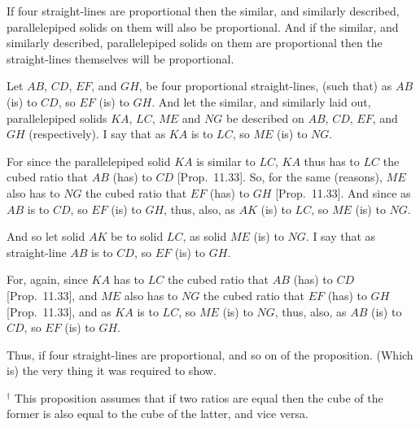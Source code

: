 \begin{Parallel}{}{}
{If four straight-lines are  proportional then the  similar, and similarly described, parallelepiped solids on them will
also be proportional. And if the similar, and similarly
described, parallelepiped solids on them are proportional
then the straight-lines themselves will be  proportional.\\

\epsfysize=1.9in
\centerline{}

Let $AB$, $CD$, $EF$, and $GH$, be four proportional
straight-lines, (such that) as $AB$ (is) to $CD$, so $EF$ (is) to $GH$. 
And let the similar, and similarly laid out, parallelepiped solids $KA$,
$LC$, $ME$ and $NG$ be described on $AB$, $CD$,
$EF$, and $GH$ (respectively). I say that as $KA$ is to $LC$, so
$ME$ (is) to $NG$.

For since the parallelepiped solid $KA$ is similar to $LC$, $KA$
thus has to $LC$ the cubed ratio that $AB$ (has) to $CD$ [Prop.~11.33]. So, for the same (reasons), $ME$ also has to
$NG$ the cubed ratio that $EF$ (has) to $GH$ [Prop.~11.33]. And since as $AB$
is to $CD$, so $EF$ (is) to $GH$, thus, also,  as $AK$ (is) to
$LC$, so $ME$ (is) to $NG$.

And so let solid $AK$ be to solid $LC$, as solid $ME$ (is) to $NG$.
I say that as straight-line $AB$ is to $CD$, so $EF$ (is) to $GH$.

For, again, since $KA$ has to $LC$ the cubed ratio that
$AB$ (has) to $CD$ [Prop.~11.33], and $ME$ also has to $NG$ the cubed ratio
that $EF$ (has) to $GH$ [Prop.~11.33], and as $KA$ is to $LC$, so $ME$
(is) to $NG$, thus, also, as $AB$ (is) to $CD$, so $EF$ (is) to $GH$.

Thus, if four straight-lines are proportional, and so on of
the proposition. (Which is) the very thing it was required to show.}
\end{Parallel}
{\footnotesize\noindent$^\dag$ This proposition assumes that if two
ratios are equal then the cube of the former is also equal to the cube of the
latter, and {\rm  vice versa}.}

